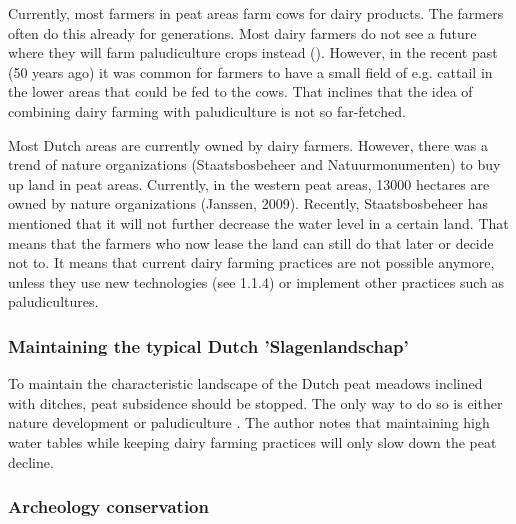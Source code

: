 \documentclass[12pt,a4paper,titlepage]{article}
\begin{document}
Currently, most farmers in peat areas farm cows for dairy products. The farmers often do this already for generations. Most dairy farmers do not see a future where they will farm paludiculture crops instead (). However, in the recent past (50 years ago) it was common for farmers to have a small field of e.g. cattail in the lower areas that could be fed to the cows. That inclines that the idea of combining dairy farming with paludiculture is not so far-fetched. 

Most Dutch areas are currently owned by dairy farmers. However, there was a trend of nature organizations (Staatsbosbeheer and Natuurmonumenten) to buy up land in peat areas. Currently, in the western peat areas, 13000 hectares are owned by nature organizations (Janssen, 2009). Recently, Staatsbosbeheer has mentioned that it will not further decrease the water level in a certain land. That means that the farmers who now lease the land can still do that later or decide not to. It means that current dairy farming practices are not possible anymore, unless they use new technologies (see 1.1.4) or implement other practices such as paludicultures. 

\subsubsection{Maintaining the typical Dutch 'Slagenlandschap'}

To maintain the characteristic landscape of the Dutch peat meadows inclined with ditches, peat subsidence should be stopped. The only way to do so is either nature development or paludiculture \citep{Dosker2017}. The author notes that maintaining high water tables while keeping dairy farming practices will only slow down the peat decline. 

\subsubsection{Archeology conservation}

\clearpage
\end{document}

